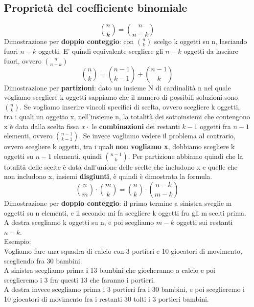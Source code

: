 \documentclass{report}
\begin{document}
    \subsection{Proprietà del coefficiente binomiale}
        $$\binom{n}{k} = \binom{n}{n-k}$$
        Dimostrazione per \textbf{doppio conteggio}: con $\binom{n}{k}$ scelgo k oggetti su n,
        lasciando fuori $n-k$ oggetti. E' quindi equivalente scegliere gli
        $n-k$ oggetti da lasciare fuori, ovvero $\binom{n}{n-k}$ \\
        $$\binom{n}{k} = \binom{n-1}{k-1} + \binom{n-1}{k}$$
        Dimostrazione per \textbf{partizioni}: dato un insieme N di cardinalità n
        nel quale vogliamo scegliere k oggetti sappiamo che il numero di possibili
        soluzioni sono $\binom{n}{k}$.
        Se vogliamo inserire vincoli specifici di scelta, ovvero scegliere k oggetti,
        tra i quali un oggetto x, nell'insieme n, la totalità dei 
        sottoinsiemi che contengono x è data dalla scelta fissa $x \cdot$ le \textbf{combinazioni}
        dei restanti $k-1$ oggetti fra $n-1$ elementi, ovvero $\binom{n-1}{k-1}$.
        Se invece vogliamo vedere il problema al contrario, ovvero scegliere k oggetti,
        tra i quali \textbf{non vogliamo x}, dobbiamo scegliere k oggetti su $n-1$
        elementi, quindi $\binom{n-1}{k}$. Per partizione abbiamo quindi che la totalità
        delle scelte è data dall'unione delle scelte che includono x e quelle che non includono
        x, insiemi \textbf{disgiunti}, è quindi è dimostrata la formula. \\
        $$\binom{n}{m} \cdot \binom{m}{k} = \binom{n}{k} \cdot \binom{n-k}{m-k}$$
        Dimostrazione per \textbf{doppio conteggio}: il primo termine a sinistra
        sveglie m oggetti su n elementi, e il secondo mi fa scegliere
        k oggetti fra gli m scelti prima. A destra scegliamo k oggetti su n,
        e poi scegliamo $m-k$ oggetti sui restanti $n-k$. \\
        Esempio: \\
            Vogliamo fare una squadra di calcio con 3 portieri e 10 giocatori di movimento, 
            scegliendo fra 30 bambini. \\
            A sinistra scegliamo prima i 13 bambini che giocheranno a calcio e poi 
            sceglieremo i 3 fra questi 13 che faranno i portieri. \\
            A destra invece scegliamo prima i 3 portieri fra i 30 bambini, e poi
            sceglieremo i 10 giocatori di movimento fra i restanti 30 tolti i 3 portieri bambini.
\end{document}
